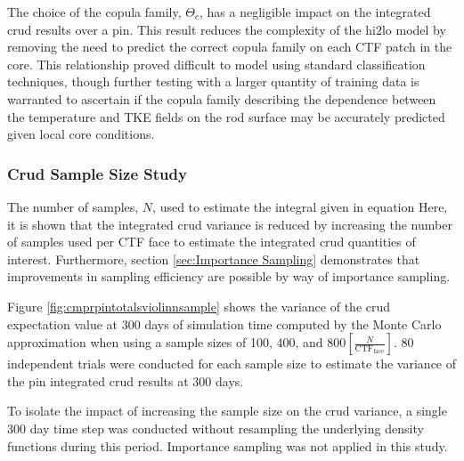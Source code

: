 The choice of the copula family, $\Theta_c$, has a negligible impact on the integrated crud results over a pin.  This result reduces the complexity of the hi2lo model by removing the need to predict the correct copula family on each CTF patch in the core. %
This relationship proved difficult to model using standard classification techniques, though further testing with a larger quantity of training data is warranted to ascertain if the copula family describing the dependence between the temperature and TKE fields on the rod surface may be accurately predicted given local core conditions.

\subsubsection{Crud Sample Size Study}

The number of samples, $N$, used to estimate the integral given in equation %
Here, it is shown that the integrated crud variance is reduced by increasing the number of samples used per CTF face to estimate the integrated crud quantities of interest.   Furthermore, section \ref{sec:Importance Sampling} demonstrates that improvements in sampling efficiency are possible by way of importance sampling.

Figure \ref{fig:cmprpintotalsviolinnsample} shows the variance of the crud expectation value at 300 days of simulation time computed by the Monte Carlo approximation when using a sample sizes of 100, 400, and $800  [\frac{N}{\mathrm{CTF_{face}}}]$.  80 independent trials were conducted for each sample size to estimate the variance of the pin integrated crud results at 300 days.

To isolate the impact of increasing the sample size on the crud variance, a single 300 day time step was conducted without resampling the underlying density functions during this period.  Importance sampling was not applied in this study.


